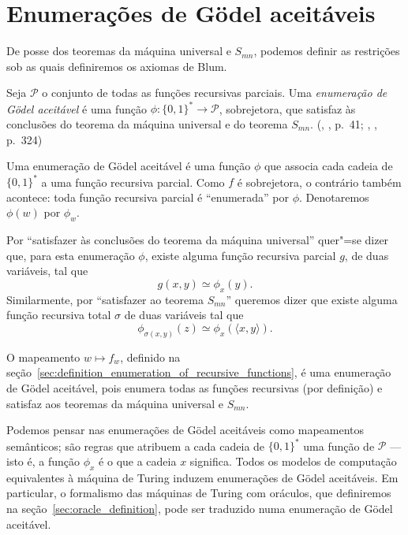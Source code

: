 \section{Enumerações de Gödel aceitáveis}
\label{sec:acceptable_godel_numbering}

De posse dos teoremas da máquina universal e $S_{mn}$,
podemos definir as restrições sob as quais definiremos os axiomas de Blum.

\begin{definition}
    Seja $\mathcal P$ o conjunto de todas as funções recursivas parciais.
    Uma \emph{enumeração de Gödel aceitável}
    é uma função $\phi: \{0, 1\}^* \to \mathcal P$, sobrejetora,
    que satisfaz às conclusões do teorema da máquina universal
    e do teorema $S_{mn}$.
    (\citeauthor{Rogers1987}, \citeyear{Rogers1987}, p.~41;
    \citeauthor{Blum1967}, \citeyear{Blum1967}, p.~324)
\end{definition}

Uma enumeração de Gödel aceitável é uma função $\phi$ que associa
cada cadeia de $\{0, 1\}^*$ a uma função recursiva parcial.
Como $f$ é sobrejetora,
o contrário também acontece:
toda função recursiva parcial é ``enumerada'' por $\phi$.
Denotaremos $\phi(w)$ por $\phi_w$.

Por ``satisfazer às conclusões do teorema da máquina universal''
quer"=se dizer que,
para esta enumeração $\phi$,
existe alguma função recursiva parcial $g$, de duas variáveis,
tal que
\begin{equation*}
    g(x, y) \simeq \phi_x(y).
\end{equation*}
Similarmente, por ``satisfazer ao teorema $S_{mn}$'' queremos dizer que
existe alguma função recursiva total $\sigma$ de duas variáveis tal que
\begin{equation*}
    \phi_{\sigma(x, y)}(z) \simeq \phi_x(\langle x, y \rangle).
\end{equation*}

\begin{example}
    O mapeamento $w \mapsto f_w$,
    definido na seção~\ref{sec:definition_enumeration_of_recursive_functions},
    é uma enumeração de Gödel aceitável,
    pois enumera todas as funções recursivas (por definição)
    e satisfaz aos teoremas da máquina universal e $S_{mn}$.
\end{example}

Podemos pensar nas enumerações de Gödel aceitáveis
como mapeamentos semânticos;
são regras que atribuem a cada cadeia de $\{0, 1\}^*$
uma função de $\mathcal P$ --- isto é,
a função $\phi_x$ é o que a cadeia $x$ significa.
Todos os modelos de computação equivalentes à máquina de Turing
induzem enumerações de Gödel aceitáveis.
Em particular,
o formalismo das máquinas de Turing com oráculos,
que definiremos na seção~\ref{sec:oracle_definition},
pode ser traduzido numa enumeração de Gödel aceitável.

